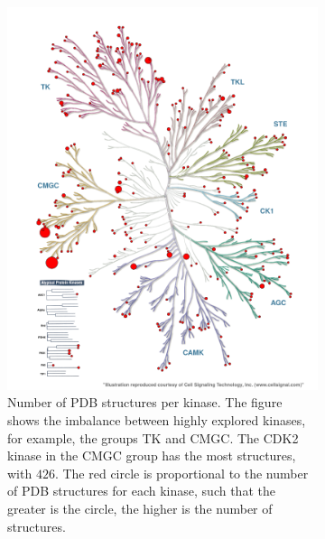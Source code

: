 \documentclass[9pt,training,ASAPversion]{livecoms}
\begin{document}
\begin{figure}
     \centering
     \begin{subfigure}[b]{0.45\textwidth}
         \centering
         \includegraphics[width=\textwidth]{kinmap_n_structures_per_kinase.png}
         \caption{Number of PDB structures per kinase. The figure shows the imbalance between highly explored kinases, for example, the groups TK and CMGC. The CDK2 kinase in the CMGC group has the most structures, with $426$. The red circle is proportional to the number of PDB structures for each kinase, such that the greater is the circle, the higher is the number of structures.}
         \label{fig:structure_per_kinase}
     \end{subfigure}
     \hfill
     \begin{subfigure}[b]{0.45\textwidth}
         \centering

\end{subfigure}
\end{figure}
\end{document}
